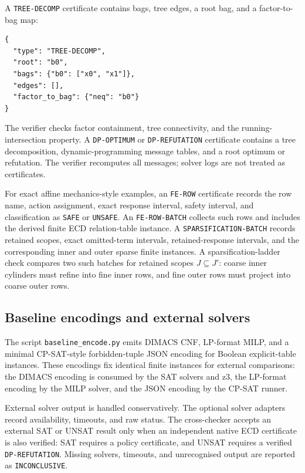 A \texttt{TREE-DECOMP} certificate contains bags, tree edges, a root bag, and a
factor-to-bag map:
\begin{verbatim}
{
  "type": "TREE-DECOMP",
  "root": "b0",
  "bags": {"b0": ["x0", "x1"]},
  "edges": [],
  "factor_to_bag": {"neq": "b0"}
}
\end{verbatim}
The verifier checks factor containment, tree connectivity, and the
running-intersection property. A \texttt{DP-OPTIMUM} or \texttt{DP-REFUTATION}
certificate contains a tree decomposition, dynamic-programming message tables,
and a root optimum or refutation. The verifier recomputes all messages; solver
logs are not treated as certificates.

For exact affine mechanics-style examples, an \texttt{FE-ROW} certificate records
the row name, action assignment, exact response interval, safety interval, and
classification as \texttt{SAFE} or \texttt{UNSAFE}. An \texttt{FE-ROW-BATCH}
collects such rows and includes the derived finite ECD relation-table instance.
A \texttt{SPARSIFICATION-BATCH} records retained scopes, exact omitted-term
intervals, retained-response intervals, and the corresponding inner and outer
sparse finite instances. A sparsification-ladder check compares two such batches
for retained scopes $J\subseteq J'$: coarse inner cylinders must refine into fine
inner rows, and fine outer rows must project into coarse outer rows.

\subsection{Baseline encodings and external solvers}

The script \texttt{baseline\_encode.py} emits DIMACS CNF, LP-format MILP, and a
minimal CP-SAT-style forbidden-tuple JSON encoding for Boolean explicit-table
instances. These encodings fix identical finite instances for external
comparisons: the DIMACS encoding is consumed by the SAT solvers and z3, the
LP-format encoding by the MILP solver, and the JSON encoding by the CP-SAT
runner.

External solver output is handled conservatively. The optional solver adapters
record availability, timeouts, and raw status. The cross-checker accepts an
external SAT or UNSAT result only when an independent native ECD certificate is
also verified: SAT requires a policy certificate, and UNSAT requires a verified
\texttt{DP-REFUTATION}. Missing solvers, timeouts, and unrecognised output are
reported as \texttt{INCONCLUSIVE}.

